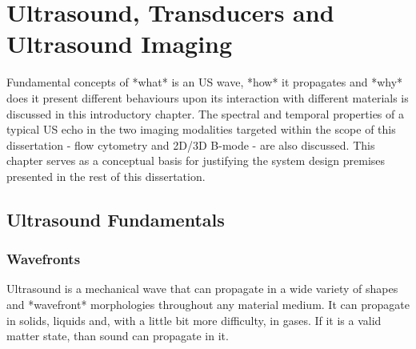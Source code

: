 
%

\chapter{Ultrasound, Transducers and Ultrasound Imaging}
\label{cha:users_manual}

\glsresetall

Fundamental concepts of *what* is an US wave, *how* it propagates and *why* 
does it present different behaviours upon its interaction with different materials 
is discussed in this introductory chapter. The spectral and temporal properties of 
a typical US echo in the two imaging modalities targeted within the scope of this 
dissertation - flow cytometry and 2D/3D B-mode - are also discussed.
This chapter serves as a conceptual basis for justifying the system design premises 
presented in the rest of this dissertation. 

\section{Ultrasound Fundamentals}
\label{sec:ultrasound_fundamentals}

\subsection{Wavefronts}
\label{subsec:ch2_1_wavefronts}

Ultrasound is a mechanical wave that can propagate in a wide variety of 
shapes and *wavefront* morphologies throughout any material medium. It 
can propagate in solids, liquids and, with a little bit more difficulty, 
in gases. If it is a valid matter state, than sound can propagate in it.

